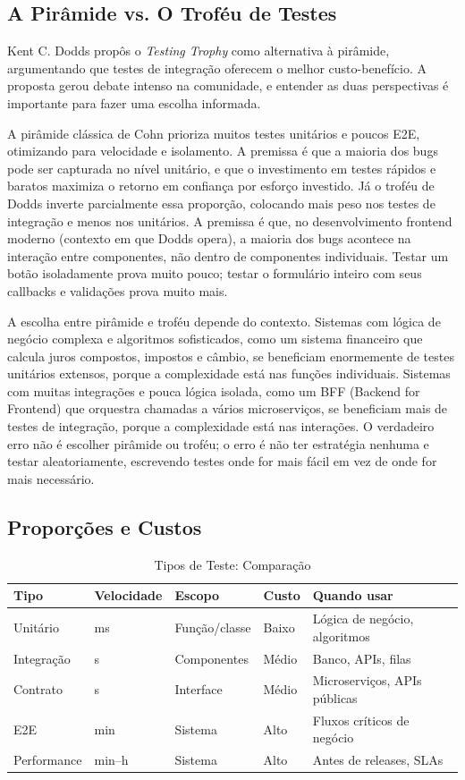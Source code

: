 \subsection{A Pirâmide vs. O Troféu de Testes}

Kent C. Dodds propôs o \textit{Testing Trophy} como alternativa à pirâmide,
argumentando que testes de integração oferecem o melhor custo-benefício. A
proposta gerou debate intenso na comunidade, e entender as duas perspectivas é
importante para fazer uma escolha informada.

A pirâmide clássica de Cohn prioriza muitos testes unitários e poucos E2E,
otimizando para velocidade e isolamento. A premissa é que a maioria dos bugs
pode ser capturada no nível unitário, e que o investimento em testes rápidos e
baratos maximiza o retorno em confiança por esforço investido. Já o troféu de
Dodds inverte parcialmente essa proporção, colocando mais peso nos testes de
integração e menos nos unitários. A premissa é que, no desenvolvimento frontend
moderno (contexto em que Dodds opera), a maioria dos bugs acontece na interação
entre componentes, não dentro de componentes individuais. Testar um botão
isoladamente prova muito pouco; testar o formulário inteiro com seus callbacks
e validações prova muito mais.

A escolha entre pirâmide e troféu depende do contexto. Sistemas com
lógica de negócio complexa e algoritmos sofisticados, como um sistema
financeiro que calcula juros compostos, impostos e câmbio, se beneficiam
enormemente de testes unitários extensos, porque a complexidade está nas
funções individuais. Sistemas com muitas integrações e pouca lógica isolada,
como um BFF (Backend for Frontend) que orquestra chamadas a vários
microserviços, se beneficiam mais de testes de integração, porque a
complexidade está nas interações. O verdadeiro erro não é escolher pirâmide ou
troféu; o erro é não ter estratégia nenhuma e testar aleatoriamente, escrevendo
testes onde for mais fácil em vez de onde for mais necessário.

\subsection{Proporções e Custos}

\begin{table}[htbp]
\centering
\caption{Tipos de Teste: Comparação}
\begin{tabular}{@{}lllll@{}}
\toprule
\textbf{Tipo} & \textbf{Velocidade} & \textbf{Escopo} & \textbf{Custo} & \textbf{Quando usar} \\
\midrule
Unitário & ms & Função/classe & Baixo & Lógica de negócio, algoritmos \\
Integração & s & Componentes & Médio & Banco, APIs, filas \\
Contrato & s & Interface & Médio & Microserviços, APIs públicas \\
E2E & min & Sistema & Alto & Fluxos críticos de negócio \\
Performance & min--h & Sistema & Alto & Antes de releases, SLAs \\
\bottomrule
\end{tabular}
\end{table}

